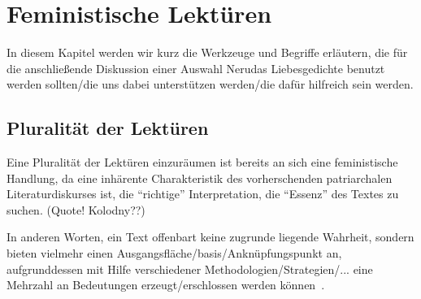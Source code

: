 \section{Feministische Lektüren}


In diesem Kapitel werden wir kurz die Werkzeuge und Begriffe erläutern, die für die anschließende Diskussion einer Auswahl Nerudas Liebesgedichte benutzt werden sollten/die uns dabei unterstützen werden/die dafür hilfreich sein werden.

\begin{comment}
feminist criticism very quickly moved
beyond merely "expos[ing] sexism in one work of literature after
another"\autocite{Kolodny1980}
--> Tu ich das? Merely exposing sexism in one work of literature? Ist es ok? mach ich vlt sonst was anderes?
\end{comment}


\subsection{Pluralität der Lektüren}

Eine Pluralität der Lektüren einzuräumen ist bereits an sich eine feministische Handlung,
da eine inhärente Charakteristik des vorherschenden patriarchalen Literaturdiskurses ist, die ``richtige'' Interpretation, die ``Essenz'' des Textes zu suchen. (Quote! Kolodny??)
\begin{comment}
   * Pluralität (vlt in die Intro vorziehen)
     Annette Kolodny: "In my view, our purpose is not and should not be the formulation of any single reading method or potentially procrustean set of critical procedures[...] Instead, as I se it, our task is to initiate nothing less than a playful pluralism, responsice to the possibilities of multiple critical schools and methods, but captive of none.."
\end{comment}

In anderen Worten, ein Text offenbart keine zugrunde liegende Wahrheit, sondern bieten vielmehr einen Ausgangsfläche/basis/Anknüpfungspunkt an, aufgrunddessen mit Hilfe verschiedener Methodologien/Strategien/... eine Mehrzahl an Bedeutungen erzeugt/erschlossen werden können~\autocite{Beehler1988}.

